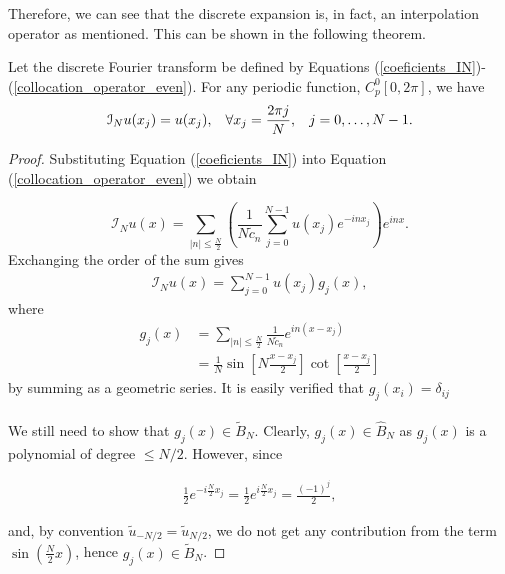 	Therefore, we can see that the discrete expansion is, in fact, an interpolation operator as mentioned. This can be shown in the following theorem.\\
	
	\begin{teor}
	Let the discrete Fourier transform be defined by Equations (\ref{coeficients_IN})-(\ref{collocation_operator_even}). For any periodic function, $C^{0}_p [0, 2\pi]$, we have
	\begin{align*}
		\mathcal{I}_N u(x_j) = u(x_j), \hspace{0.3cm} \forall x_j = \frac{2 \pi j}{N} , \hspace{0.3cm} j = 0, \dots, N - 1. 
	\end{align*}
	\end{teor}

	\begin{proof}
	Substituting Equation (\ref{coeficients_IN}) into Equation (\ref{collocation_operator_even}) we obtain
	
	\begin{equation*}
    	\mathcal{I}_N u(x) =  \displaystyle \sum_{ |n| \leq \frac {N}{2}} \left(\frac{1}{N \widetilde{c}_n}  \displaystyle \sum_{j = 0}^{N - 1} u(x_j) e^{-in x_j}\right) e^{inx}.
	\end{equation*}
	Exchanging the order of the sum gives
	\begin{align}
	    \mathcal{I}_N u(x) = \displaystyle \sum_{j=0}^{N-1} u(x_j) g_j (x),
	\end{align}
	where
	\begin{align*}
	    g_j (x) &= \displaystyle \sum_{ |n| \leq \frac {N}{2}} \frac{1}{N \widetilde{c}_n} e^{in(x -x_j)}\\
	    &= \frac{1}{N} \sin\left[N \frac{x - x_j}{2} \right] \cot\left[\frac{x - x_j}{2} \right]
	\end{align*}
	by summing as a geometric series. It is easily verified that $g_j (x_i) = \delta_{ij}$\\
	\\
	We still need to show that $g_j (x) \in \widetilde{B}_N$. Clearly, $g_j (x) \in \hat{B}_N$ as $g_j (x)$ is a polynomial of degree $\leq N/2$. However, since
	
	\begin{align*}
	    \frac{1}{2} e^{-i \frac{N}{2} x_j} = \frac{1}{2} e^{i \frac{N}{2} x_j} = \frac{(-1)^j}{2},
	\end{align*}
	
	and, by convention $\widetilde{u}_{-N/2} = \widetilde{u}_{N/2}$, we do not get any contribution from the term $\sin(\frac{N}{2} x)$, hence $g_j (x) \in \widetilde{B}_N$.
	\end{proof}
	
